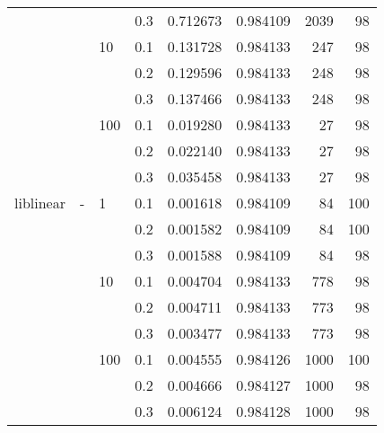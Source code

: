 \begin{table}[H]
\begin{tabular}{llllrrrr}
          &   &     & 0.3 &  0.712673 &  0.984109 &    2039 &    98 \\
          &   & 10  & 0.1 &  0.131728 &  0.984133 &     247 &    98 \\
          &   &     & 0.2 &  0.129596 &  0.984133 &     248 &    98 \\
          &   &     & 0.3 &  0.137466 &  0.984133 &     248 &    98 \\
          &   & 100 & 0.1 &  0.019280 &  0.984133 &      27 &    98 \\
          &   &     & 0.2 &  0.022140 &  0.984133 &      27 &    98 \\
          &   &     & 0.3 &  0.035458 &  0.984133 &      27 &    98 \\
liblinear & - & 1   & 0.1 &  0.001618 &  0.984109 &      84 &   100 \\
          &   &     & 0.2 &  0.001582 &  0.984109 &      84 &   100 \\
          &   &     & 0.3 &  0.001588 &  0.984109 &      84 &    98 \\
          &   & 10  & 0.1 &  0.004704 &  0.984133 &     778 &    98 \\
          &   &     & 0.2 &  0.004711 &  0.984133 &     773 &    98 \\
          &   &     & 0.3 &  0.003477 &  0.984133 &     773 &    98 \\
          &   & 100 & 0.1 &  0.004555 &  0.984126 &    1000 &   100 \\
          &   &     & 0.2 &  0.004666 &  0.984127 &    1000 &    98 \\
          &   &     & 0.3 &  0.006124 &  0.984128 &    1000 &    98 \\
\bottomrule
\end{tabular}
\end{table}
